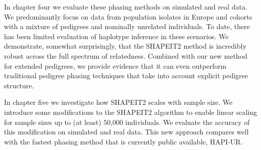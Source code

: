 In chapter four we evaluate these phasing methods on simulated and real data.  We predominantly focus on data from population isolates in Europe and cohorts with a mixture of pedigrees and nominally unrelated individuals.  To date, there has been limited evaluation of haplotype inference in these scenarios.  We demonstrate, somewhat surprisingly, that the SHAPEIT2 method is incredibly robust across the full spectrum of relatedness.  Combined with our new method for extended pedigrees, we provide evidence that it can even outperform traditional pedigree phasing techniques that take into account explicit pedigree structure.

In chapter five we investigate how SHAPEIT2 scales with sample size.  We introduce some modifications to the SHAPEIT2 algorithm to enable linear scaling for sample sizes up to (at least) 50,000 individuals.  We evaluate the accuracy of this modification on simulated and real data. This new approach compares well with the fastest phasing method that is currently public available, HAPI-UR.


